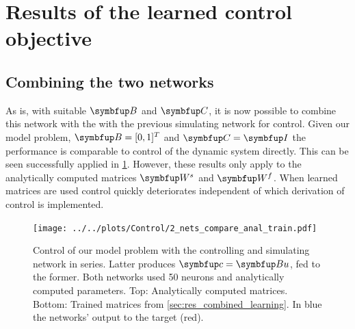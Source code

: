 \section{Results of the learned control objective}\label{sec:res_total}

\subsection{Combining the two networks}\label{ssec:combining-2-network}
As is, with suitable $\bmu{B}$ and $\bmu{C}$, it is now possible to combine this network with the with the previous simulating network for control. Given our model problem, $\bmu{B} = [0,1]^T$ and $\bmu{C} = \bmu{I}$ the performance is comparable to control of the dynamic system directly. This can be seen successfully applied in \cref{fig:2_connected_control}. However, these results only apply to the analytically computed matrices $\bmu{W}^s$ and $\bmu{W}^f$.  When learned matrices are used control quickly deteriorates independent of which derivation of control is implemented.\\
\begin{figure}
	\centering
	\texttt{[image: ../../plots/Control/2\_nets\_compare\_anal\_train.pdf]}
	\caption{Control of our model problem with the controlling and simulating network in series. Latter produces $\bmu{c} = \bmu{Bu}$, fed to the former. Both networks used 50 neurons and analytically computed parameters. Top: Analytically computed matrices. Bottom: Trained matrices from \cref{sec:res_combined_learning}. In blue the networks' output to the target (red).}
	\label{fig:2_connected_control}
\end{figure}

